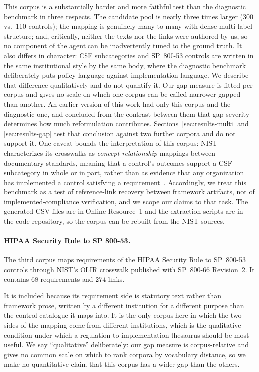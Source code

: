 \documentclass[a4paper,fleqn]{cas-sc}
\begin{document}
This corpus is a substantially harder and more faithful test than the diagnostic benchmark in three respects.
The candidate pool is nearly three times larger (300 vs.\ 110 controls); the mapping is genuinely many-to-many with dense multi-label structure; and, critically, neither the texts nor the links were authored by us, so no component of the agent can be inadvertently tuned to the ground truth.
It also differs in character: CSF subcategories and SP~800-53 controls are written in the same institutional style by the same body, where the diagnostic benchmark deliberately puts policy language against implementation language. We describe that difference qualitatively and do not quantify it. Our gap measure is fitted per corpus and gives no scale on which one corpus can be called narrower-gapped than another.
An earlier version of this work had only this corpus and the diagnostic one, and concluded from the contrast between them that gap severity determines how much reformulation contributes. Sections~\ref{sec:results-multi} and \ref{sec:results-gap} test that conclusion against two further corpora and do not support it.
One caveat bounds the interpretation of this corpus: NIST characterizes its crosswalks as \emph{concept relationship} mappings between documentary standards, meaning that a control's outcomes support a CSF subcategory in whole or in part, rather than as evidence that any organization has implemented a control satisfying a requirement~\citep{NISTIR8477}.
Accordingly, we treat this benchmark as a test of reference-link recovery between framework artifacts, not of implemented-compliance verification, and we scope our claims to that task.
The generated CSV files are in Online Resource~1 and the extraction scripts are in the code repository, so the corpus can be rebuilt from the NIST sources.

\paragraph{HIPAA Security Rule to SP 800-53.}
\label{sec:dataset-hipaa}

The third corpus maps requirements of the HIPAA Security Rule to SP~800-53 controls through NIST's OLIR crosswalk published with SP~800-66 Revision~2. It contains 68 requirements and 274 links.

It is included because its requirement side is statutory text rather than framework prose, written by a different institution for a different purpose than the control catalogue it maps into. It is the only corpus here in which the two sides of the mapping come from different institutions, which is the qualitative condition under which a regulation-to-implementation thesaurus should be most useful. We say ``qualitative'' deliberately: our gap measure is corpus-relative and gives no common scale on which to rank corpora by vocabulary distance, so we make no quantitative claim that this corpus has a wider gap than the others.
\end{document}
